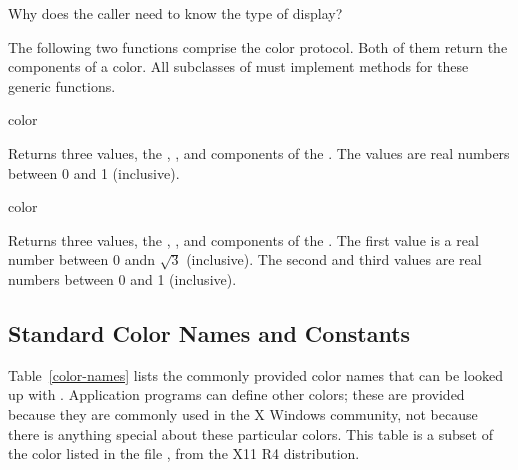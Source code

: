  {Why does the caller need to know the type of display?}


The following two functions comprise the color protocol.  Both of them return
the components of a color.  All subclasses of  must implement methods
for these generic functions.

 {color}

Returns three values, the , , and  components of
the  . The values are real numbers between 0 and 1
(inclusive).

 {color}

Returns three values, the , , and 
components of the  .  The first value is a real number
between 0 andn $\sqrt{3}$ (inclusive).  The second and third values are real
numbers between 0 and 1 (inclusive).


\subsection {Standard Color Names and Constants}

Table~\ref{color-names} lists the commonly provided color names that can be
looked up with .  Application programs can define other
colors; these are provided because they are commonly used in the X Windows
community, not because there is anything special about these particular colors.
This table is a subset of the color listed in the file
, from the X11 R4 distribution.

